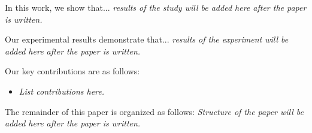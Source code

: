 In this work, we show that... \textit{results of the study will be added here after the paper is written.}

Our experimental results demonstrate that... \textit{results of the experiment will be added here after the paper is written.}

Our key contributions are as follows:
\begin{itemize}
	\item \textit{List contributions here.}
\end{itemize}


The remainder of this paper is organized as follows:
\textit{Structure of the paper will be added here after the paper is written.}
